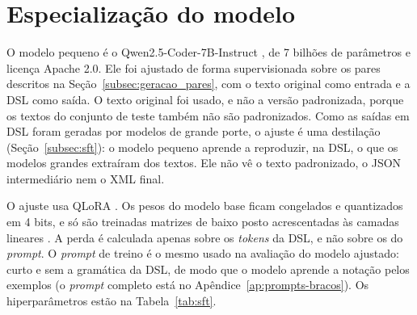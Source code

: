\section{Especialização do modelo}\label{sec:sft}

O modelo pequeno é o Qwen2.5-Coder-7B-Instruct \cite{hui2024qwen25coder}, de 7 bilhões de parâmetros e licença Apache 2.0. Ele foi ajustado de forma supervisionada sobre os pares descritos na Seção~\ref{subsec:geracao_pares}, com o texto original como entrada e a DSL como saída. O texto original foi usado, e não a versão padronizada, porque os textos do conjunto de teste também não são padronizados. Como as saídas em DSL foram geradas por modelos de grande porte, o ajuste é uma destilação (Seção~\ref{subsec:sft}): o modelo pequeno aprende a reproduzir, na DSL, o que os modelos grandes extraíram dos textos. Ele não vê o texto padronizado, o JSON intermediário nem o XML final.

O ajuste usa QLoRA \cite{dettmers2023qlora}. Os pesos do modelo base ficam congelados e quantizados em 4 bits, e só são treinadas matrizes de baixo posto acrescentadas às camadas lineares \cite{hu2022lora}. A perda é calculada apenas sobre os \textit{tokens} da DSL, e não sobre os do \textit{prompt}. O \textit{prompt} de treino é o mesmo usado na avaliação do modelo ajustado: curto e sem a gramática da DSL, de modo que o modelo aprende a notação pelos exemplos (o \textit{prompt} completo está no Apêndice~\ref{ap:prompts-bracos}). Os hiperparâmetros estão na Tabela~\ref{tab:sft}.

\begin{table}[htb]
\end{table}

